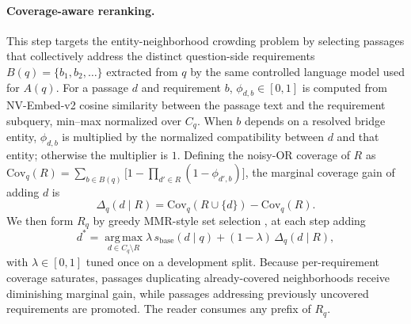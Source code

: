 \paragraph{Coverage-aware reranking.}
This step targets the entity-neighborhood crowding problem by
selecting passages that collectively address the distinct
question-side requirements $B(q)=\{b_1,b_2,\ldots\}$ extracted from
$q$ by the same controlled language model used for $A(q)$. For a
passage $d$ and requirement $b$, $\phi_{d,b}\in[0,1]$ is computed
from NV-Embed-v2 cosine similarity between the passage text and
the requirement subquery, min--max normalized over $C_q$. When $b$
depends on a resolved bridge entity, $\phi_{d,b}$ is multiplied by
the normalized compatibility between $d$ and that entity;
otherwise the multiplier is $1$. Defining the noisy-OR coverage of
$R$ as
$\mathrm{Cov}_q(R)=\sum_{b\in B(q)}\bigl[1-\prod_{d'\in R}(1-\phi_{d',b})\bigr]$,
the marginal coverage gain of adding $d$ is
\begin{equation}
\label{eq:marginal-gain}
\Delta_q(d \mid R) = \mathrm{Cov}_q(R\cup\{d\}) - \mathrm{Cov}_q(R).
\end{equation}
We then form $R_q$ by greedy MMR-style set selection
\citep{carbonell1998mmr,lin2011submodular}, at each step adding
\begin{equation}
\label{eq:greedy-rerank}
d^{*}
=
\operatorname*{arg\,max}_{d \in C_q \setminus R}
\lambda\,s_{\mathrm{base}}(d \mid q)
+
(1-\lambda)\,\Delta_q(d \mid R),
\end{equation}
with $\lambda \in [0,1]$ tuned once on a development split. Because
per-requirement coverage saturates, passages duplicating
already-covered neighborhoods receive diminishing marginal gain,
while passages addressing previously uncovered requirements are
promoted. The reader consumes any prefix of $R_q$.
